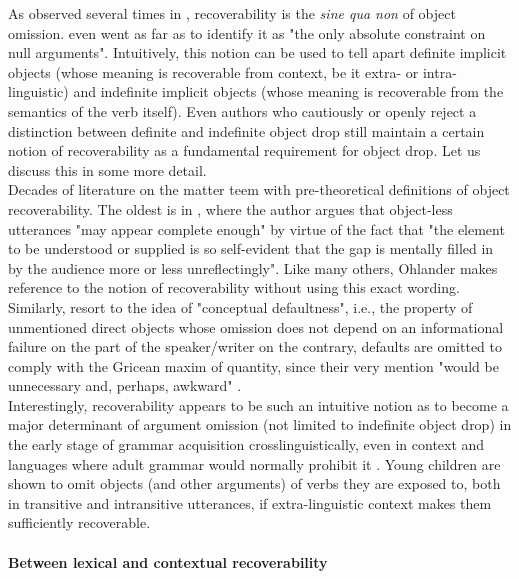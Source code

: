 As observed several times in , recoverability is the \textit{sine qua non} of object omission. \textcite{Cote1996} even went as far as to identify it as "the only absolute constraint on null arguments". Intuitively, this notion can be used to tell apart definite implicit objects (whose meaning is recoverable from context, be it extra- or intra-linguistic) and indefinite implicit objects (whose meaning is recoverable from the semantics of the verb itself). Even authors who cautiously \parencite{Resnik1993, Resnik1996, OlsenResnik1997} or openly \parencite{Glass2013, Glass2020, glass2022english} reject a distinction between definite and indefinite object drop still maintain a certain notion of recoverability as a fundamental requirement for object drop. Let us discuss this in some more detail.\\
Decades of literature on the matter teem with pre-theoretical definitions of object recoverability. The oldest is in \textcite[105]{Ohlander1943}, where the author argues that object-less utterances "may appear complete enough" by virtue of the fact that "the element to be understood or supplied is so self-evident that the gap is mentally filled in by the audience more or less unreflectingly". Like many others, Ohlander makes reference to the notion of recoverability without using this exact wording. Similarly, \textcite{HickmanEtAl2016} resort to the idea of "conceptual defaultness", i.e., the property of unmentioned direct objects whose omission does not depend on an informational failure on the part of the speaker/writer \textemdash on the contrary, defaults are omitted to comply with the Gricean maxim of quantity, since their very mention "would be unnecessary and, perhaps, awkward" \parencite[516]{HickmanEtAl2016}.\\
Interestingly, recoverability appears to be such an intuitive notion as to become a major determinant of argument omission (not limited to indefinite object drop) in the early stage of grammar acquisition crosslinguistically, even in context and languages where adult grammar would normally prohibit it \parencite{allen2000discourse, RatitamkulEtAl2004, Medina2007, sopata2016null, Rasetti2003, PerezLerouxEtAl2011, PerezLerouxEtAl2013, Perez-LerouxEtAl2018, OGradyEtAl2008, Ingham1993}. Young children are shown to omit objects (and other arguments) of verbs they are exposed to, both in transitive and intransitive utterances, if extra-linguistic context makes them sufficiently recoverable.


\paragraph{Between lexical and contextual recoverability}

